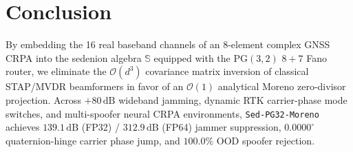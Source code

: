 \documentclass[11pt,a4paper]{article}
\theoremstyle{definition}
\theoremstyle{remark}
\newcommand{\Se}{\mathbb{S}}
\newcommand{\PG}{\mathrm{PG}}
\begin{document}
\section{Conclusion}
\label{sec:conclusion}

By embedding the 16 real baseband channels of an 8-element complex GNSS CRPA into the sedenion algebra $\Se$ equipped with the $\PG(3,2)$ $8+7$ Fano router, we eliminate the $\mathcal{O}(d^3)$ covariance matrix inversion of classical STAP/MVDR beamformers in favor of an $\mathcal{O}(1)$ analytical Moreno zero-divisor projection. Across $+80\,\mathrm{dB}$ wideband jamming, dynamic RTK carrier-phase mode switches, and multi-spoofer neural CRPA environments, \texttt{Sed-PG32-Moreno} achieves $139.1\,\mathrm{dB}$ (FP32) / $312.9\,\mathrm{dB}$ (FP64) jammer suppression, $0.0000^\circ$ quaternion-hinge carrier phase jump, and $100.0\%$ OOD spoofer rejection.
\end{document}
